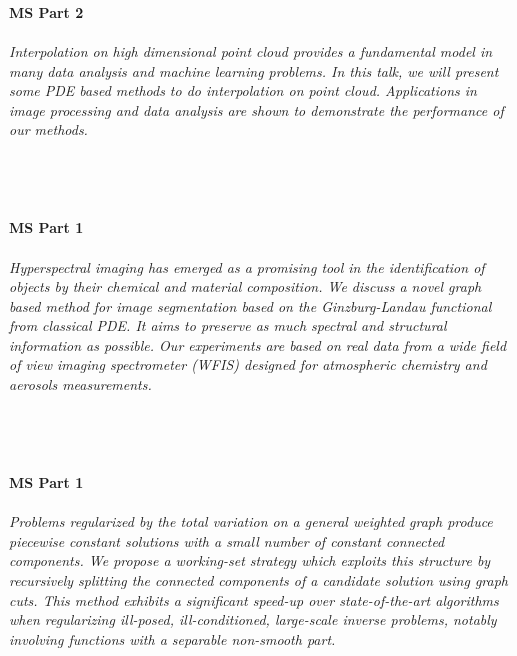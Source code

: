 \begin{multicols}{2}
    \\
    \\\\
    \noindent\textbf{MS Part 2}\\
\\  
    \textit{Interpolation on high dimensional point cloud provides a fundamental model in many data analysis and machine learning problems. In this talk, we will present some PDE based methods to do interpolation on point cloud. Applications in image processing and data analysis are shown to demonstrate the performance of our methods.}\\
\\ 
    \\
    \\\\
    \noindent\textbf{MS Part 1}\\
\\  
    \textit{Hyperspectral imaging has emerged as a promising tool in the identification of objects by their chemical and material composition. We discuss a novel graph based method for image segmentation based on the Ginzburg-Landau functional from classical PDE. It aims to preserve as much spectral and structural information as possible. Our experiments are based on real data from a wide field of view imaging spectrometer (WFIS) designed for atmospheric chemistry and aerosols measurements.}\\
\\ 
    \\
    \\\\
    \noindent\textbf{MS Part 1}\\
\\  
    \textit{Problems regularized by the total variation on a general weighted graph produce piecewise constant solutions with a small number of constant connected components. We propose a working-set strategy which exploits this structure by recursively splitting the connected components of a candidate solution using graph cuts. This method exhibits a significant speed-up over state-of-the-art algorithms when regularizing ill-posed, ill-conditioned, large-scale inverse problems, notably involving functions with a separable non-smooth part.}\\
\\ 
    \\

\end{multicols}
